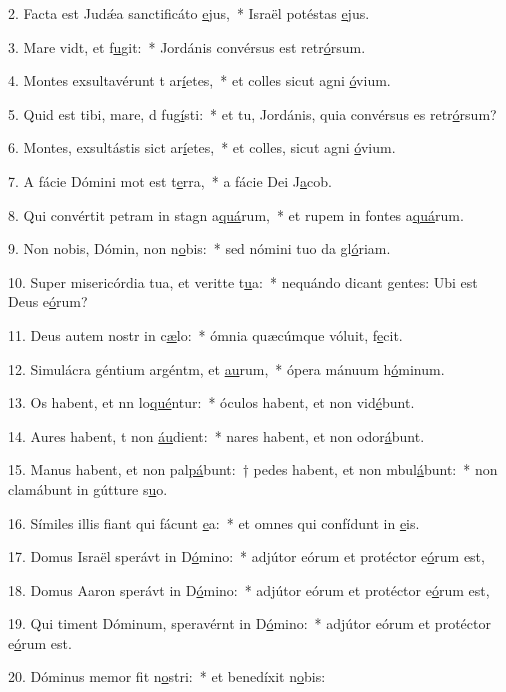 2. Facta est Judǽa sanctificáto \uline{e}jus,~* Israël potéstas \uline{e}jus.\par 
3. Mare vidt, et f\uline{u}git:~* Jordánis convérsus est retr\uline{ó}rsum.\par 
4. Montes exsultavérunt t ar\uline{í}etes,~* et colles sicut agni \uline{ó}vium.\par 
5. Quid est tibi, mare, d fug\uline{í}sti:~* et tu, Jordánis, quia convérsus es retr\uline{ó}rsum?\par 
6. Montes, exsultástis sict ar\uline{í}etes,~* et colles, sicut agni \uline{ó}vium.\par 
7. A fácie Dómini mot est t\uline{e}rra,~* a fácie Dei J\uline{a}cob.\par 
8. Qui convértit petram in stagn a\uline{quá}rum,~* et rupem in fontes a\uline{quá}rum.\par 
9. Non nobis, Dómin, non n\uline{o}bis:~* sed nómini tuo da gl\uline{ó}riam.\par 
10. Super misericórdia tua, et veritte t\uline{u}a:~* nequándo dicant gentes: Ubi est Deus e\uline{ó}rum?\par 
11. Deus autem nostr in c\uline{æ}lo:~* ómnia quæcúmque vóluit, f\uline{e}cit.\par 
12. Simulácra géntium argéntm, et \uline{au}rum,~* ópera mánuum h\uline{ó}minum.\par 
13. Os habent, et nn lo\uline{qué}ntur:~* óculos habent, et non vid\uline{é}bunt.\par 
14. Aures habent, t non \uline{áu}dient:~* nares habent, et non odor\uline{á}bunt.\par 
15. Manus habent, et non pal\uline{pá}bunt:~† pedes habent, et non mbul\uline{á}bunt:~* non clamábunt in gútture s\uline{u}o.\par 
16. Símiles illis fiant qui fácunt \uline{e}a:~* et omnes qui confídunt in \uline{e}is.\par 
17. Domus Israël sperávt in D\uline{ó}mino:~* adjútor eórum et protéctor e\uline{ó}rum est,\par 
18. Domus Aaron sperávt in D\uline{ó}mino:~* adjútor eórum et protéctor e\uline{ó}rum est,\par 
19. Qui timent Dóminum, speravérnt in D\uline{ó}mino:~* adjútor eórum et protéctor e\uline{ó}rum est.\par 
20. Dóminus memor fit n\uline{o}stri:~* et benedíxit n\uline{o}bis:\par 
